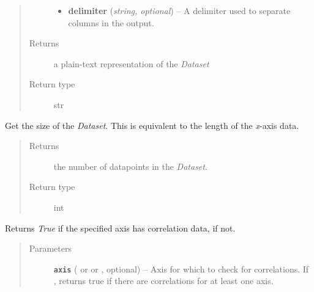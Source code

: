 \documentclass[a4paper,10pt,english]{sphinxmanual}
\begin{document}
\begin{fulllineitems}
\begin{fulllineitems}
\begin{quote}
\begin{description}
\begin{itemize}
\item {} 
\textbf{delimiter} (\emph{string, optional}) --
A delimiter used to separate columns in the output.

\end{itemize}

\item[{Returns}] \leavevmode
a plain-text representation of the \emph{Dataset}

\item[{Return type}] \leavevmode
str

\end{description}\end{quote}

\end{fulllineitems}


\begin{fulllineitems}
\label{index:kafe.dataset.Dataset.get_size}
Get the size of the \emph{Dataset}. This is equivalent to the length of the
\emph{x}-axis data.
\begin{quote}\begin{description}
\item[{Returns}] \leavevmode
the number of datapoints in the \emph{Dataset}.

\item[{Return type}] \leavevmode
int

\end{description}\end{quote}

\end{fulllineitems}


\begin{fulllineitems}
\label{index:kafe.dataset.Dataset.has_correlations}
Returns \emph{True} if the specified axis has correlation data,  if
not.
\begin{quote}\begin{description}
\item[{Parameters}] \leavevmode
\textbf{\texttt{axis}} ( or  or , optional) -- Axis for which to check for correlations. If ,
returns true if there are correlations for at least one axis.


\end{description}
\end{quote}
\end{fulllineitems}
\end{fulllineitems}
\end{document}
